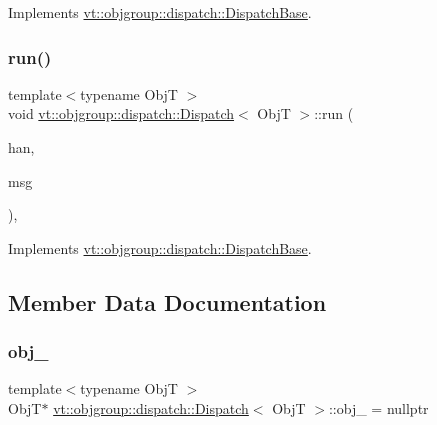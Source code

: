 Implements \hyperlink{structvt_1_1objgroup_1_1dispatch_1_1_dispatch_base_ad0ba1baf3de179f6d6b749aedcd76490}{vt\+::objgroup\+::dispatch\+::\+Dispatch\+Base}.

\mbox{\label{structvt_1_1objgroup_1_1dispatch_1_1_dispatch_a9e6b35e9ff07fcc30c69b37fed60f770}} 
\subsubsection{\texorpdfstring{run()}{run()}}
{\footnotesize\ttfamily template$<$typename ObjT $>$ \\
void \hyperlink{structvt_1_1objgroup_1_1dispatch_1_1_dispatch}{vt\+::objgroup\+::dispatch\+::\+Dispatch}$<$ ObjT $>$\+::run (\begin{DoxyParamCaption}\item[{\hyperlink{namespacevt_af64846b57dfcaf104da3ef6967917573}{Handler\+Type}}]{han,  }\item[{\hyperlink{namespacevt_ac34f95a5e2b8109b55bfba52b074443d}{Base\+Message} $\ast$}]{msg }\end{DoxyParamCaption})\hspace{0.3cm}{\ttfamily [override]}, {\ttfamily [virtual]}}



Implements \hyperlink{structvt_1_1objgroup_1_1dispatch_1_1_dispatch_base_a539a57642138f35e38419e57e9138a2f}{vt\+::objgroup\+::dispatch\+::\+Dispatch\+Base}.



\subsection{Member Data Documentation}
\mbox{\label{structvt_1_1objgroup_1_1dispatch_1_1_dispatch_af555d34b05bb69173d48b8ece3854414}} 
\subsubsection{\texorpdfstring{obj\+\_\+}{obj\_}}
{\footnotesize\ttfamily template$<$typename ObjT $>$ \\
ObjT$\ast$ \hyperlink{structvt_1_1objgroup_1_1dispatch_1_1_dispatch}{vt\+::objgroup\+::dispatch\+::\+Dispatch}$<$ ObjT $>$\+::obj\+\_\+ = nullptr\hspace{0.3cm}{\ttfamily [private]}}



